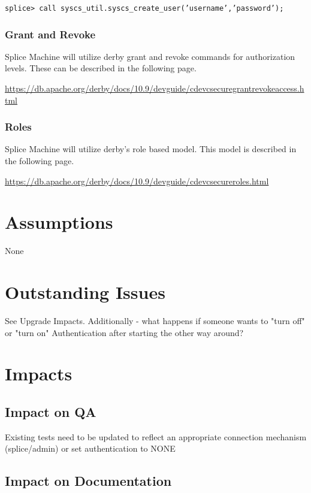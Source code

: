 \texttt{splice> call syscs\_util.syscs\_create\_user('username','password');}

\subsubsection{Grant and Revoke}

Splice Machine will utilize derby grant and revoke commands for
authorization levels.  These can be described in the following page.

\url{https://db.apache.org/derby/docs/10.9/devguide/cdevcsecuregrantrevokeaccess.html}

\subsubsection{Roles}

Splice Machine will utilize derby's role based model.  This model is described
in the following page.

\url{https://db.apache.org/derby/docs/10.9/devguide/cdevcsecureroles.html}


\section{Assumptions}

None

\section{Outstanding Issues}

See Upgrade Impacts.  Additionally - what happens if someone wants to "turn off" or "turn on" Authentication after starting the other way around?

\section{Impacts}

\subsection{Impact on QA}

Existing tests need to be updated to reflect an appropriate connection mechanism (splice/admin) or set authentication to NONE

\subsection{Impact on Documentation} 

